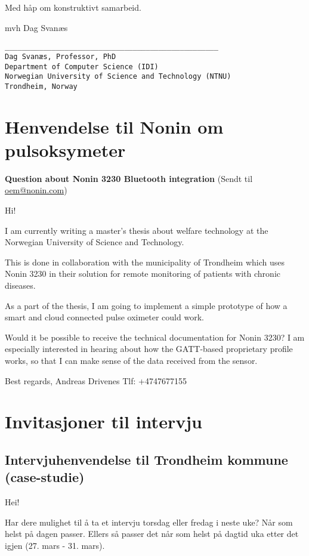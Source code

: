 Med håp om konstruktivt samarbeid.

mvh
Dag Svanæs

\begin{verbatim}
__________________________________________________
Dag Svanæs, Professor, PhD
Department of Computer Science (IDI)
Norwegian University of Science and Technology (NTNU)
Trondheim, Norway
\end{verbatim}

\chapter{Henvendelse til Nonin om pulsoksymeter}
\label{appendix:pulsoksymeter}
\textbf{Question about Nonin 3230 Bluetooth integration}
(Sendt til \url{oem@nonin.com})

Hi!

I am currently writing a master's thesis about welfare technology at the Norwegian University of Science and Technology. 

This is done in collaboration with the municipality of Trondheim which uses Nonin 3230 in their
solution for remote monitoring of patients with chronic diseases. 

As a part of the thesis, I am going to implement a simple prototype of how a smart and cloud connected pulse oximeter could work.

Would it be possible to receive the technical documentation for Nonin 3230?
I am especially interested in hearing about how the GATT-based proprietary profile works, so
that I can make sense of the data received from the sensor. 

Best regards,\newline
Andreas Drivenes\newline
Tlf: +4747677155

\chapter{Invitasjoner til intervju}
\label{appendix:invitasjon_evaluering}

\section{Intervjuhenvendelse til Trondheim kommune (case-studie)}
Hei!

Har dere mulighet til å ta et intervju torsdag eller fredag i neste uke? Når som helst på dagen passer. 
Ellers så passer det når som helst på dagtid uka etter det igjen (27. mars - 31. mars).

